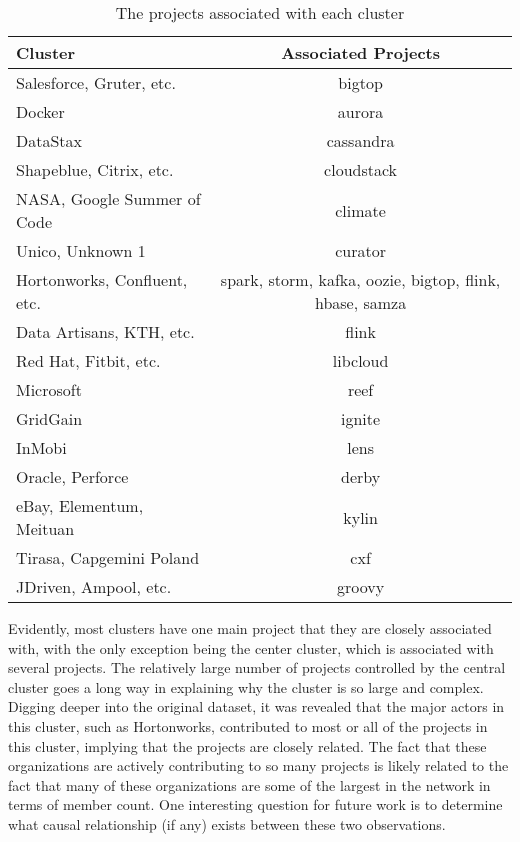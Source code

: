 \begin{table}
	\begin{tabular}{l|c}
		\bfseries Cluster & \bfseries Associated Projects \\
		\hline
		Salesforce, Gruter, etc. & bigtop \\
		\hline
		Docker & aurora \\
		\hline
		DataStax & cassandra \\
		\hline
		Shapeblue, Citrix, etc. & cloudstack \\
		\hline
		NASA, Google Summer of Code & climate \\
		\hline
		Unico, Unknown 1 & curator \\
		\hline
		Hortonworks, Confluent, etc. & spark, storm, kafka, oozie, bigtop, flink, hbase, samza \\
		\hline
		Data Artisans, KTH, etc. & flink \\
		\hline
		Red Hat, Fitbit, etc. & libcloud \\
		\hline
		Microsoft & reef \\
		\hline
		GridGain & ignite \\
		\hline
		InMobi & lens \\
		\hline
		Oracle, Perforce & derby \\
		\hline
		eBay, Elementum, Meituan & kylin \\
		\hline
		Tirasa, Capgemini Poland & cxf \\
		\hline
		JDriven, Ampool, etc. & groovy
	\end{tabular}
	\caption{The projects associated with each cluster}\label{tab:clusterprojects}
\end{table}

Evidently, most clusters have one main project that they are closely associated with, with the only exception being the center cluster, which is associated with several projects. The relatively large number of projects controlled by the central cluster goes a long way in explaining why the cluster is so large and complex. Digging deeper into the original dataset, it was revealed that the major actors in this cluster, such as Hortonworks, contributed to most or all of the projects in this cluster, implying that the projects are closely related. The fact that these organizations are actively contributing to so many projects is likely related to the fact that many of these organizations are some of the largest in the network in terms of member count. One interesting question for future work is to determine what causal relationship (if any) exists between these two observations.